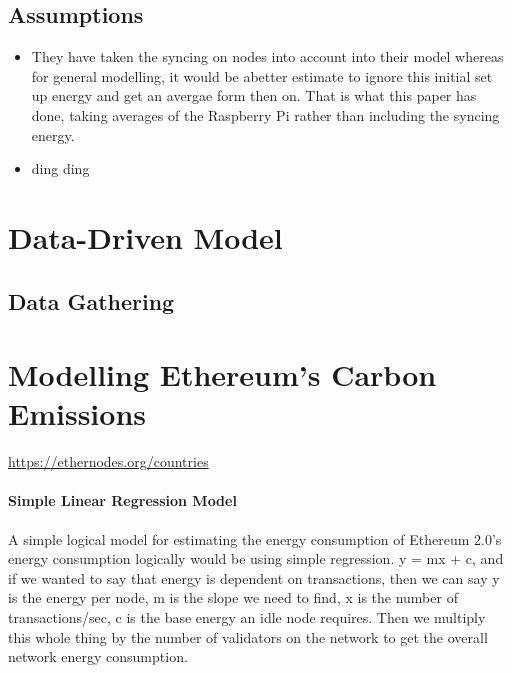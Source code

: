 \subsection{Assumptions}

\begin{itemize}
    \item They have taken the syncing on nodes into account into their model whereas for general modelling, it would be  abetter estimate to ignore this initial set up energy and get an avergae form then on. That is what this paper has done, taking averages of the Raspberry Pi rather than including the syncing energy.
    \item ding ding
\end{itemize}


\section{ Data-Driven Model}
\subsection{Data Gathering}






\section {Modelling Ethereum's Carbon Emissions}
\url{https://ethernodes.org/countries}

\paragraph{ Simple Linear Regression Model}
A simple logical model for estimating the energy consumption of Ethereum 2.0's energy consumption logically would be using simple regression. y = mx + c, and if we wanted to say that energy is dependent on transactions, then we can say y is the energy per node, m is the slope we need to find, x is the number of transactions/sec, c is the base energy an idle node requires. Then we multiply this whole thing by the number of validators on the network to get the overall network energy consumption.

